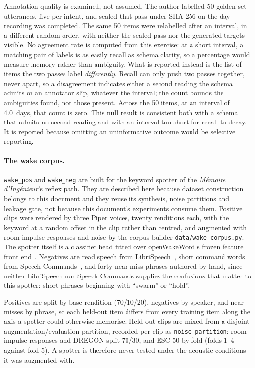  Annotation quality is examined, not assumed. The author labelled 50 golden-set utterances, five
per intent, and sealed that pass under SHA-256 on the day recording was completed. The same 50 items
were relabelled after an interval, in a different random order, with neither the sealed pass nor the
generated targets visible. No agreement rate is computed from this exercise: at a short interval, a matching
pair of labels is as easily recall as schema clarity, so a percentage would measure memory rather
than ambiguity. What is reported instead is the list of items the two passes label
\emph{differently}. Recall can only push two passes together, never apart, so a disagreement
indicates either a second reading the schema admits or an annotator slip, whatever the interval;
the count bounds the ambiguities found, not those present. Across the 50 items, at an interval of
4.0~days, that count is zero. This null result is consistent both with a schema that admits no
second reading and with an interval too short for recall to decay. It is reported because omitting
an uninformative outcome would be selective reporting.

\paragraph{The wake corpus.}  \texttt{wake\_pos} and \texttt{wake\_neg} are built for the keyword
spotter of the \emph{M\'emoire d'Ing\'enieur}'s reflex path. They are described here because
dataset construction belongs to this document and they reuse its synthesis, noise partitions and
leakage gate, not because this document's experiments consume them. Positive clips were rendered by
three Piper voices, twenty renditions each, with the keyword at a random offset in the clip rather
than centred, and augmented with room impulse responses and noise by the corpus builder
\texttt{data/wake\_corpus.py}. The spotter itself is a classifier head fitted over openWakeWord's
frozen feature front end~\cite{oww}. Negatives are read speech from LibriSpeech~\cite{librispeech},
short command words from Speech Commands~\cite{speechcmd}, and forty near-miss phrases authored by
hand, since neither LibriSpeech nor Speech Commands supplies the confusions that matter to this
spotter: short phrases beginning with ``swarm'' or ``hold''.

 Positives are split by base rendition (70/10/20), negatives by speaker, and near-misses by phrase,
so each held-out item differs from every training item along the axis a spotter could otherwise
memorise. Held-out clips are mixed from a disjoint augmentation/evaluation partition, recorded per
clip as \texttt{noise\_partition}: room impulse responses and DREGON split 70/30, and ESC-50 by
fold (folds 1--4 against fold 5). A spotter is therefore never tested under the acoustic
conditions it was augmented with.

